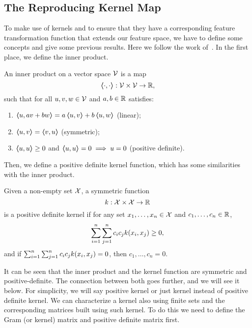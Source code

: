 \subsection{The Reproducing Kernel Map} %
To make use of kernels and to ensure that they have a corresponding feature transformation function that extends our feature space, we have to define some concepts and give some previous results. Here we follow the work of~\citet{ScholkopfS02}.
In the first place, we define the inner product.
%
\begin{definition}
    An inner product on a vector space $\mathcal{V}$ is a map
    $$\bm{\left\langle} \cdot, \cdot \bm{\right\rangle}: \mathcal{V} \times \mathcal{V} \to \mathbb{R} , $$
    such that for all $u, v, w \in \mathcal{V}$ and $a, b \in \mathbb{R}$ satisfies:
    \begin{enumerate}
        \item $\bm{\left\langle} u, a v + b w \bm{\right\rangle} = a\bm{\left\langle} u, v \bm{\right\rangle} + b\bm{\left\langle} u, w \bm{\right\rangle}$ (linear);
        \item $\bm{\left\langle} u, v \bm{\right\rangle} = \bm{\left\langle} v, u \bm{\right\rangle}$ (symmetric);
        \item $\bm{\left\langle} u, u \bm{\right\rangle} \geq 0$ and $\bm{\left\langle} u, u \bm{\right\rangle} = 0 \implies u = 0$ (positive definite).
    \end{enumerate} 
\end{definition}
%
Then, we define a positive definite kernel function, which has some similarities with the inner product.
\begin{definition}
    Given a non-empty set $\mathcal{X}$, a symmetric function
    \begin{equation}
        \nonumber
        k: \mathcal{X} \times \mathcal{X} \to \mathbb{R}
    \end{equation}
    is a positive definite kernel if for any set $x_1, \ldots, x_n \in \mathcal{X}$ and $c_1, \ldots, c_n \in \mathbb{R}$,
    \begin{equation}
        \nonumber
        \sum_{i=1}^n \sum_{j=1}^n c_i c_j k(x_i, x_j) \geq 0 ,
    \end{equation} 
    and if $\sum_{i=1}^n \sum_{j=1}^n c_i c_j k(x_i, x_j) = 0$, then $c_1, \ldots, c_n = 0$.
\end{definition}
%
It can be seen that the inner product and the kernel function are symmetric and positive-definite. The connection between both goes further, and we will see it below.
%
For simplicity, we will say positive kernel or just kernel instead of positive definite kernel. We can characterize a kernel also using finite sets and the corresponding matrices built using such kernel. To do this we need to define the Gram (or kernel) matrix and positive definite matrix first.
